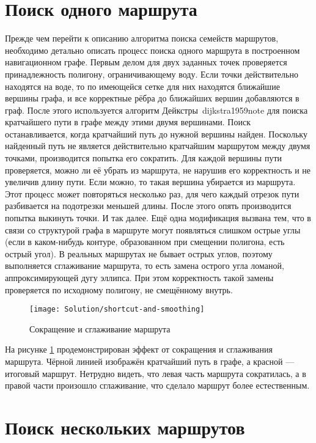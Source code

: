 \FloatBarrier

\section{Поиск одного маршрута}

Прежде чем перейти к описанию алгоритма поиска семейств маршрутов,
необходимо детально описать процесс поиска одного маршрута в
построенном навигационном графе. Первым делом для двух заданных точек
проверяется принадлежность полигону, ограничивающему воду. Если точки
действительно находятся на воде, то по имеющейся сетке для них
находятся ближайшие вершины графа, и все корректные рёбра до ближайших
вершин добавляются в граф. После этого используется алгоритм
Дейкстры~{dijkstra1959note} для поиска кратчайшего пути в графе между
этими двумя вершинами. Поиск останавливается, когда кратчайший путь до
нужной вершины найден. Поскольку найденный путь не является
действительно кратчайшим маршрутом между двумя точками, производится
попытка его сократить. Для каждой вершины пути проверяется, можно ли
её убрать из маршрута, не нарушив его корректность и не увеличив длину
пути. Если можно, то такая вершина убирается из маршрута. Этот процесс
может повторяться несколько раз, для чего каждый отрезок пути
разбивается на подотрезки меньшей длины. После этого опять
производится попытка выкинуть точки. И так далее. Ещё одна модификация
вызвана тем, что в связи со структурой графа в маршруте могут
появляться слишком острые углы (если в каком-нибудь контуре,
образованном при смещении полигона, есть острый угол). В реальных
маршрутах не бывает острых углов, поэтому выполняется сглаживание
маршрута, то есть замена острого угла ломаной, аппроксимирующей дугу
эллипса. При этом корректность такой замены проверяется по исходному
полигону, не смещённому внутрь.

\begin{figure}
    \texttt{[image: Solution/shortcut-and-smoothing]}
    \caption{Сокращение и сглаживание маршрута}
    \label{fig:path-improvements}
\end{figure}

На рисунке \ref{fig:path-improvements} продемонстрирован эффект от
сокращения и сглаживания маршрута. Чёрной линией изображён кратчайший
путь в графе, а красной --- итоговый маршрут. Нетрудно видеть, что
левая часть маршрута сократилась, а в правой части произошло
сглаживание, что сделало маршрут более естественным.

\FloatBarrier

\section{Поиск нескольких маршрутов}

\FloatBarrier

